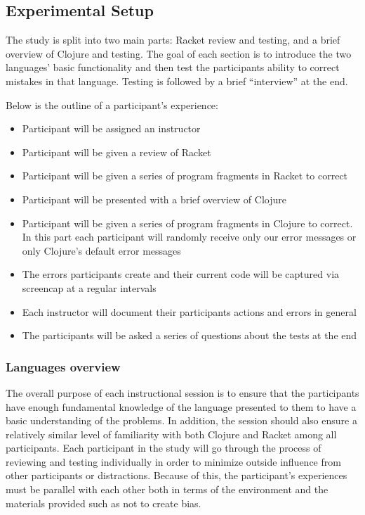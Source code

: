 \documentclass[submission,copyright,creativecommons]{eptcs}
\newcommand{\allcomments}[1]{{#1}}
\newcommand{\thcomment}[1]{{\bf \textcolor{blue}{\allcomments{{#1}}}}}
\begin{document}
	\subsection{Experimental Setup}\label{sec:setup}
	
	   
The study is split into two main parts: Racket review and testing, and a brief overview of Clojure and testing.
The goal of each section is to introduce the two languages' basic functionality and then test the participants ability to correct mistakes in that language.
 Testing is followed by a brief ``interview'' at the end. 

Below is the outline of a participant's experience:
\begin{itemize}
\item Participant will be assigned an instructor
\item Participant will be given a review of Racket
\item Participant will be given a series of program fragments in Racket to correct
\item Participant will be presented with a brief overview of Clojure
\item Participant will be given a series of  program fragments in Clojure to correct. In this part each participant will randomly receive only our error messages or only Clojure's default error messages
\item The errors participants create and their current code will be captured via screencap at a regular intervals
\item Each instructor will document their participants actions and errors in general
\item The participants will be asked a series of questions about the tests at the end
\end{itemize}

\subsubsection{Languages overview}\label{subsec:overview}

The overall purpose of each instructional session is to ensure that the participants have enough fundamental knowledge of the language presented to them to have a basic understanding of the problems. 
In addition, the session should also ensure a relatively similar level of familiarity with both Clojure and Racket among all participants. 
Each participant in the study will go through the process of reviewing and testing individually in order to minimize outside influence from other participants or distractions. 
Because of this, the participant's experiences must be parallel with each other both in terms of the environment and the materials provided such as not to create bias.
\end{document}
